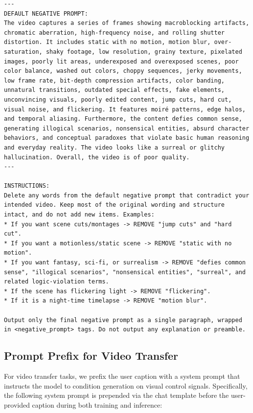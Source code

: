 \documentclass{llmxive}
\begin{document}
\begin{tcolorbox}
\begin{Verbatim}[breaklines=true,breakanywhere=true,fontsize=\scriptsize]
---
DEFAULT NEGATIVE PROMPT:
The video captures a series of frames showing macroblocking artifacts, chromatic aberration, high-frequency noise, and rolling shutter distortion. It includes static with no motion, motion blur, over-saturation, shaky footage, low resolution, grainy texture, pixelated images, poorly lit areas, underexposed and overexposed scenes, poor color balance, washed out colors, choppy sequences, jerky movements, low frame rate, bit-depth compression artifacts, color banding, unnatural transitions, outdated special effects, fake elements, unconvincing visuals, poorly edited content, jump cuts, hard cut, visual noise, and flickering. It features moiré patterns, edge halos, and temporal aliasing. Furthermore, the content defies common sense, generating illogical scenarios, nonsensical entities, absurd character behaviors, and conceptual paradoxes that violate basic human reasoning and everyday reality. The video looks like a surreal or glitchy hallucination. Overall, the video is of poor quality.
---

INSTRUCTIONS:
Delete any words from the default negative prompt that contradict your intended video. Keep most of the original wording and structure intact, and do not add new items. Examples:
* If you want scene cuts/montages -> REMOVE "jump cuts" and "hard cut".
* If you want a motionless/static scene -> REMOVE "static with no motion".
* If you want fantasy, sci-fi, or surrealism -> REMOVE "defies common sense", "illogical scenarios", "nonsensical entities", "surreal", and related logic-violation terms.
* If the scene has flickering light -> REMOVE "flickering".
* If it is a night-time timelapse -> REMOVE "motion blur".

Output only the final negative prompt as a single paragraph, wrapped in <negative_prompt> tags. Do not output any explanation or preamble.
\end{Verbatim}
\end{tcolorbox}

\subsection{Prompt Prefix for Video Transfer}
\label{appendix:generator_transfer_prompt_prefix}
For video transfer tasks, we prefix the user caption with a system prompt that instructs the model to condition generation on visual control signals. Specifically, the following system prompt is prepended via the chat template before the user-provided caption during both training and inference:
\end{document}
